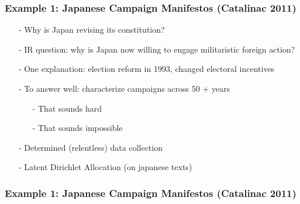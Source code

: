 \documentclass{beamer}
\numberwithin{equation}{section}
\begin{document}
\begin{frame}
\frametitle{Example 1: Japanese Campaign Manifestos (Catalinac 2011)}


\begin{itemize}
\item[-] Why is Japan revising its constitution?
\item[-] \alert{IR} question: why is Japan now willing to engage militaristic foreign action?
\item[-] \alert{One explanation}: election reform in 1993, changed electoral incentives
\item[-] To answer well: characterize campaigns across 50 + years
\begin{itemize}
\item[-] \alert{That sounds hard}
\item[-] \alert{That sounds impossible}
\end{itemize}
\item[-] Determined (relentless) data collection
\item[-] Latent Dirichlet Allocation (on japanese texts)
\end{itemize}


\end{frame}



\begin{frame}
\frametitle{Example 1: Japanese Campaign Manifestos (Catalinac 2011) }




\pause


\end{frame}
\end{document}
